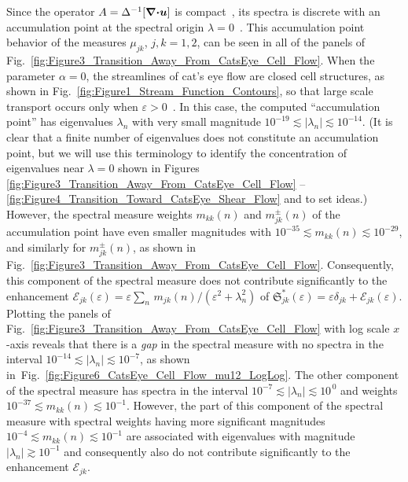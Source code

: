 \documentclass[english,12pt,jmp,graphicx]{revtex4-1}
\newcommand{\vecu}{\boldsymbol{u}}
\newcommand{\figref}[1]{Fig.~\ref{#1}}
\newcommand{\numfigref}[1]{\ref{#1}}
\newcommand{\bnabla}{\mbox{\boldmath${\nabla}$}}
\newcommand{\bcdot}{\mbox{\boldmath${\cdot}$}}
\newcommand{\Sg}{\mathfrak{S}}
\begin{document}
Since the operator $A=\Delta^{-1}[\bnabla\bcdot\vecu]$ is
compact~\cite{Bhattacharya:AAP:1999:951,Bhattacharya:1989:ASD}, its 
spectra is discrete with an accumulation point at the spectral
origin $\lambda=0$~\cite{Stakgold:BVP:2000}. This accumulation point behavior of
the measures $\mu_{jk}$, $j,k=1,2$, can be seen in all of the panels of
\figref{fig:Figure3_Transition_Away_From_CatsEye_Cell_Flow}. When the
parameter $\alpha=0$, the streamlines of cat's eye flow are closed cell
structures, as shown in \figref{fig:Figure1_Stream_Function_Contours},
so that large scale transport occurs only when
$\varepsilon>0$~\cite{Fannjiang:1994:SIAM_JAM:333}. In this case, the
computed ``accumulation point'' has eigenvalues $\lambda_n$ with very small magnitude
$10^{-19}\lesssim|\lambda_n|\lesssim10^{-14}$. (It is clear that a
finite number of eigenvalues does not constitute an accumulation point, but we
will use this terminology to identify the concentration of eigenvalues
near $\lambda=0$ shown in Figures
\numfigref{fig:Figure3_Transition_Away_From_CatsEye_Cell_Flow} --
\numfigref{fig:Figure4_Transition_Toward_CatsEye_Shear_Flow} 
and to set ideas.) However, the spectral measure 
weights $m_{kk}(n)$ and $m^\pm_{jk}(n)$ of the accumulation point have even
smaller magnitudes with 
$10^{-35}\lesssim m_{kk}(n)\lesssim10^{-29}$, and similarly for
$m^\pm_{jk}(n)$, as shown in
\figref{fig:Figure3_Transition_Away_From_CatsEye_Cell_Flow}. Consequently, 
this component of the spectral measure does not contribute
significantly to the enhancement
$\mathcal{E}_{jk}(\varepsilon)=\varepsilon\sum_n\,m_{jk}(n)/(\varepsilon^2+\lambda_n^2)$
of $\Sg_{jk}^*(\varepsilon)=\varepsilon\delta_{jk} +
\mathcal{E}_{jk}(\varepsilon)$. Plotting the panels of
\figref{fig:Figure3_Transition_Away_From_CatsEye_Cell_Flow} with log
scale $x$-axis reveals that there is a \emph{gap} in the
spectral measure with no spectra in the interval
$10^{-14}\lesssim|\lambda_n|\lesssim10^{-7}$, as shown
in~\figref{fig:Figure6_CatsEye_Cell_Flow_mu12_LogLog}. The other
component of 
the spectral measure has spectra in the interval
$10^{-7}\lesssim|\lambda_n|\lesssim10^{\,0}$
and weights
$10^{-37}\lesssim m_{kk}(n)\lesssim10^{-1}$. 
However, the part of this component of the spectral measure with
spectral weights having more significant magnitudes
$10^{-4}\lesssim m_{kk}(n)\lesssim10^{-1}$ are associated with
eigenvalues with magnitude $|\lambda_n|\gtrsim10^{-1}$ and consequently
also do not contribute significantly to the enhancement
$\mathcal{E}_{jk}$. 
\end{document}
